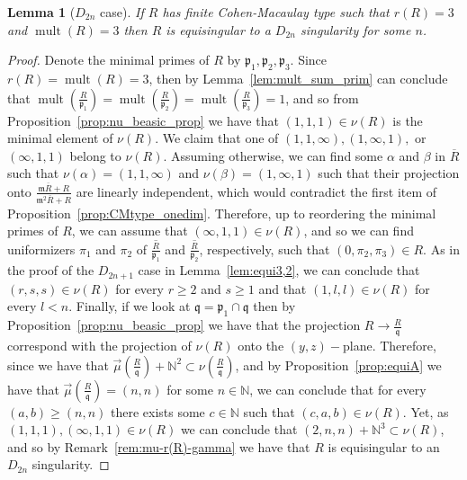 \documentclass{article}
\newtheorem{lemma}[theorem]{Lemma}
\DeclareMathOperator{\mult}{mult}
\numberwithin{theorem}{section}
\begin{document}
\begin{lemma}[$D_{2n}$ case]\label{lem:equi33}
    If $R$ has finite Cohen-Macaulay type such that $r(R)=3$ and $\mult(R)=3$ then $R$ is equisingular to a $D_{2n}$ singularity for some $n$. 
\end{lemma}

\begin{proof}
    Denote the minimal primes of $R$ by $\mathfrak{p}_1, \mathfrak{p}_2, \mathfrak{p}_3$. Since $r(R)=\mult(R)=3$, then by Lemma~\ref{lem:mult_sum_prim} can conclude that $\mult\left(\frac{R}{\mathfrak{p}_1}\right)=\mult\left(\frac{R}{\mathfrak{p}_2}\right)=\mult\left(\frac{R}{\mathfrak{p}_3}\right)=1$, and so from Proposition~\ref{prop:nu_beasic_prop} we have that $(1,1,1) \in \nu(R)$ is the minimal element of $\nu(R)$. We claim that one of $(1,1,\infty), (1,\infty,1),$ or $(\infty,1,1)$ belong to $\nu(R)$. Assuming otherwise, we can find some $\alpha$ and $\beta$ in $\overline{R}$ such that $\nu(\alpha) = (1, 1, \infty)$ and $\nu(\beta) = (1, \infty,1)$ such that their projection onto $\frac{\mathfrak{m}\overline{R}+R}{\mathfrak{m}^2 \overline{R}+R}$ are linearly independent, which would contradict the first item of Proposition~\ref{prop:CMtype_onedim}. Therefore, up to reordering the minimal primes of $R$, we can assume that $(\infty,1,1) \in \nu(R)$, and so we can find uniformizers $\pi_1$ and $\pi_2$ of  $\overline{\frac{R}{\mathfrak{p}_1}}$ and $\overline{\frac{R}{\mathfrak{p}_2}}$, respectively, such that $(0,\pi_2, \pi_3) \in R$. As in the proof of the $D_{2n+1}$ case in Lemma~\ref{lem:equi3,2}, we can conclude that $(r,s,s) \in \nu(R)$ for every $r \geq 2$ and $s \geq 1$ and that $(1,l,l) \in \nu(R)$ for every $l<n$. Finally, if we look at $\mathfrak{q}= \mathfrak{p}_1 \cap \mathfrak{q}$ then by Proposition~\ref{prop:nu_beasic_prop} we have that the projection $R \to \frac{R}{\mathfrak{q}}$ correspond with the projection of $\nu(R)$ onto the $(y,z)-$plane. Therefore, since we have that $\vec{\mu}\left(\frac{R}{\mathfrak{q}}\right) + \mathbb{N}^2 \subset \nu\left(\frac{R}{\mathfrak{q}}\right)$, and by Proposition~\ref{prop:equiA} we have that $\vec{\mu}\left(\frac{R}{\mathfrak{q}}\right)=(n,n)$ for some $n\in \mathbb{N}$, we can conclude that for every $(a,b) \geq (n,n)$ there exists some $c \in \mathbb{N}$ such that $(c,a,b) \in \nu(R)$. Yet, as $(1,1,1) , (\infty,1,1) \in \nu(R)$ we can conclude that $(2,n,n) +\mathbb{N}^3 \subset \nu(R)$, and so by Remark~\ref{rem:mu-r(R)-gamma} we have that $R$ is equisingular to an $D_{2n}$ singularity. 
\end{proof}
\end{document}
